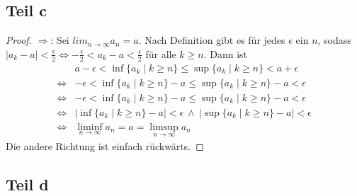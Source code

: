 \documentclass[10pt,a4paper]{article}
\begin{document}
\subsection{Teil c}
\begin{proof}
  $\Rightarrow$: Sei $lim_{n \rightarrow \infty} a_{n} = a$.
  Nach Definition gibt es für jedes $\epsilon$ ein $n$, sodass $|a_{k} - a| < \frac{\epsilon}{2} \Leftrightarrow -\frac{\epsilon}{2} < a_{k} - a < \frac{\epsilon}{2}$ für alle $k \ge n$.
  Dann ist
  \begin{align*}
    & a - \epsilon < \inf \{ a_{k} \mid k \ge n \} \le \sup \{ a_{k} \mid k \ge n \} < a + \epsilon\\
    \Leftrightarrow & -\epsilon < \inf \{ a_{k} \mid k \ge n \} - a \le \sup \{ a_{k} \mid k \ge n \} - a < \epsilon\\
    \Leftrightarrow & -\epsilon < \inf \{ a_{k} \mid k \ge n \} - a \le \sup \{ a_{k} \mid k \ge n \} - a < \epsilon\\
    \Leftrightarrow & |\inf \{ a_{k} \mid k \ge n \} - a| < \epsilon\ \land\ |\sup \{ a_{k} \mid k \ge n \} - a| < \epsilon\\
    \Leftrightarrow & \liminf_{n \rightarrow \infty} a_{n} = a = \limsup_{n \rightarrow \infty} a_{n}
  \end{align*}
  Die andere Richtung ist einfach rückwärts.
\end{proof}

\subsection{Teil d}
\end{document}
